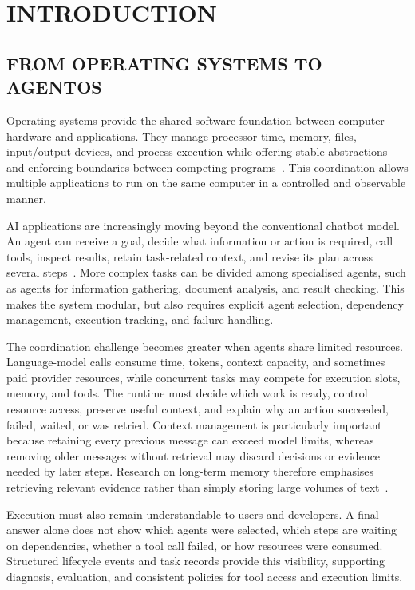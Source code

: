 \chapter{\uppercase{Introduction}}
\label{intro}

\section{\uppercase{From Operating Systems to AgentOS}}
Operating systems provide the shared software foundation between computer hardware and applications. They manage processor time, memory, files, input/output devices, and process execution while offering stable abstractions and enforcing boundaries between competing programs~\cite{silberschatz2018os}. This coordination allows multiple applications to run on the same computer in a controlled and observable manner.

AI applications are increasingly moving beyond the conventional chatbot model. An agent can receive a goal, decide what information or action is required, call tools, inspect results, retain task-related context, and revise its plan across several steps~\cite{wang2024survey}. More complex tasks can be divided among specialised agents, such as agents for information gathering, document analysis, and result checking. This makes the system modular, but also requires explicit agent selection, dependency management, execution tracking, and failure handling.

The coordination challenge becomes greater when agents share limited resources. Language-model calls consume time, tokens, context capacity, and sometimes paid provider resources, while concurrent tasks may compete for execution slots, memory, and tools. The runtime must decide which work is ready, control resource access, preserve useful context, and explain why an action succeeded, failed, waited, or was retried. Context management is particularly important because retaining every previous message can exceed model limits, whereas removing older messages without retrieval may discard decisions or evidence needed by later steps. Research on long-term memory therefore emphasises retrieving relevant evidence rather than simply storing large volumes of text~\cite{packer2023memgpt,kang2025memoryos}.

Execution must also remain understandable to users and developers. A final answer alone does not show which agents were selected, which steps are waiting on dependencies, whether a tool call failed, or how resources were consumed. Structured lifecycle events and task records provide this visibility, supporting diagnosis, evaluation, and consistent policies for tool access and execution limits.

